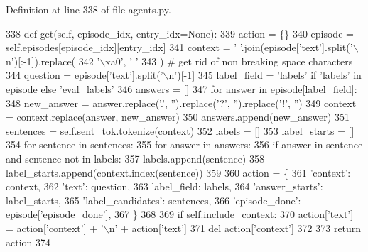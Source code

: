 Definition at line 338 of file agents.\+py.


\begin{DoxyCode}
338     \textcolor{keyword}{def }get(self, episode\_idx, entry\_idx=None):
339         action = \{\}
340         episode = self.episodes[episode\_idx][entry\_idx]
341         context = \textcolor{stringliteral}{' '}.join(episode[\textcolor{stringliteral}{'text'}].split(\textcolor{stringliteral}{'\(\backslash\)n'})[:-1]).replace(
342             \textcolor{stringliteral}{'\(\backslash\)xa0'}, \textcolor{stringliteral}{' '}
343         )  \textcolor{comment}{# get rid of non breaking space characters}
344         question = episode[\textcolor{stringliteral}{'text'}].split(\textcolor{stringliteral}{'\(\backslash\)n'})[-1]
345         label\_field = \textcolor{stringliteral}{'labels'} \textcolor{keywordflow}{if} \textcolor{stringliteral}{'labels'} \textcolor{keywordflow}{in} episode \textcolor{keywordflow}{else} \textcolor{stringliteral}{'eval\_labels'}
346         answers = []
347         \textcolor{keywordflow}{for} answer \textcolor{keywordflow}{in} episode[label\_field]:
348             new\_answer = answer.replace(\textcolor{stringliteral}{'.'}, \textcolor{stringliteral}{''}).replace(\textcolor{stringliteral}{'?'}, \textcolor{stringliteral}{''}).replace(\textcolor{stringliteral}{'!'}, \textcolor{stringliteral}{''})
349             context = context.replace(answer, new\_answer)
350             answers.append(new\_answer)
351         sentences = self.sent\_tok.\hyperlink{namespaceparlai_1_1agents_1_1tfidf__retriever_1_1build__tfidf_a1fdb457e98eb4e4c26047e229686a616}{tokenize}(context)
352         labels = []
353         label\_starts = []
354         \textcolor{keywordflow}{for} sentence \textcolor{keywordflow}{in} sentences:
355             \textcolor{keywordflow}{for} answer \textcolor{keywordflow}{in} answers:
356                 \textcolor{keywordflow}{if} answer \textcolor{keywordflow}{in} sentence \textcolor{keywordflow}{and} sentence \textcolor{keywordflow}{not} \textcolor{keywordflow}{in} labels:
357                     labels.append(sentence)
358                     label\_starts.append(context.index(sentence))
359 
360         action = \{
361             \textcolor{stringliteral}{'context'}: context,
362             \textcolor{stringliteral}{'text'}: question,
363             label\_field: labels,
364             \textcolor{stringliteral}{'answer\_starts'}: label\_starts,
365             \textcolor{stringliteral}{'label\_candidates'}: sentences,
366             \textcolor{stringliteral}{'episode\_done'}: episode[\textcolor{stringliteral}{'episode\_done'}],
367         \}
368 
369         \textcolor{keywordflow}{if} self.include\_context:
370             action[\textcolor{stringliteral}{'text'}] = action[\textcolor{stringliteral}{'context'}] + \textcolor{stringliteral}{'\(\backslash\)n'} + action[\textcolor{stringliteral}{'text'}]
371             del action[\textcolor{stringliteral}{'context'}]
372 
373         \textcolor{keywordflow}{return} action
374 \end{DoxyCode}


